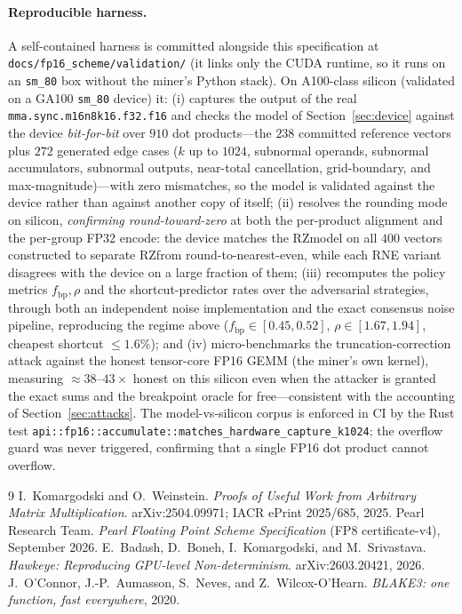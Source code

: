 \documentclass[11pt]{article}
\newcommand{\RZ}{\textsf{RZ}}
\newcommand{\FP}[1]{\textsf{FP#1}}
\begin{document}
\paragraph{Reproducible harness.} A self-contained harness is committed alongside this
specification at \texttt{docs/fp16\_scheme/validation/} (it links only the CUDA runtime, so it runs
on an \texttt{sm\_80} box without the miner's Python stack). On \textsf{A100}-class silicon
(validated on a GA100 \texttt{sm\_80} device) it:
(i) captures the output of the real \texttt{mma.sync.m16n8k16.f32.f16} and checks the model of
Section~\ref{sec:device} against the device \emph{bit-for-bit} over $910$ dot products---the $238$
committed reference vectors plus $272$ generated edge cases ($k$ up to $1024$, subnormal operands,
subnormal accumulators, subnormal outputs, near-total cancellation, grid-boundary, and
max-magnitude)---with zero mismatches, so the model is validated against the device rather than
against another copy of itself;
(ii) resolves the rounding mode on silicon, \emph{confirming round-toward-zero} at both the
per-product alignment and the per-group \FP{32} encode: the device matches the \RZ model on all
$400$ vectors constructed to separate \RZ from round-to-nearest-even, while each RNE variant
disagrees with the device on a large fraction of them;
(iii) recomputes the policy metrics $f_{\text{bp}},\rho$ and the shortcut-predictor rates over the
adversarial strategies, through both an independent noise implementation and the exact consensus
noise pipeline, reproducing the regime above ($f_{\text{bp}}\in[0.45,0.52]$,
$\rho\in[1.67,1.94]$, cheapest shortcut $\le 1.6\%$); and
(iv) micro-benchmarks the truncation-correction attack against the honest tensor-core \FP{16} GEMM
(the miner's own kernel), measuring $\approx 38\text{--}43\times$ honest on this silicon even when
the attacker is granted the exact sums and the breakpoint oracle for free---consistent with the
accounting of Section~\ref{sec:attacks}. The model-vs-silicon corpus is enforced in CI by the Rust
test \texttt{api::fp16::accumulate::matches\_hardware\_capture\_k1024}; the overflow guard was never
triggered, confirming that a single \FP{16} dot product cannot overflow.

\begin{thebibliography}{9}
 I.~Komargodski and O.~Weinstein. \emph{Proofs of Useful Work from Arbitrary Matrix
Multiplication}. arXiv:2504.09971; IACR ePrint 2025/685, 2025.
 Pearl Research Team. \emph{Pearl Floating Point Scheme Specification}
(FP8 certificate-v4), September 2026.
 E.~Badash, D.~Boneh, I.~Komargodski, and M.~Srivastava. \emph{Hawkeye:
Reproducing GPU-level Non-determinism}. arXiv:2603.20421, 2026.
 J.~O'Connor, J.-P.~Aumasson, S.~Neves, and Z.~Wilcox-O'Hearn. \emph{BLAKE3:
one function, fast everywhere}, 2020.
\end{thebibliography}
\end{document}

